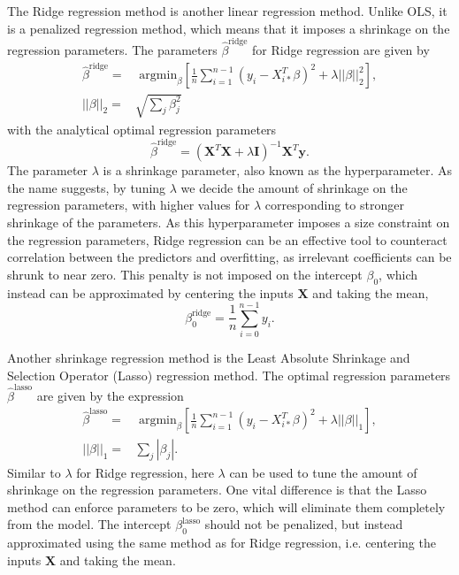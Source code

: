 \documentclass[a4paper, 10pt]{article}
\begin{document}
\begin{multicols}{2}
The Ridge regression method is another linear regression method. Unlike OLS, it is a penalized regression method, which means that it imposes a shrinkage on the regression parameters. The parameters $\hat{\beta}^\text{ridge}$ for Ridge regression are given by
\begin{align}
    \hat{\beta}^\text{ridge} = &\text{ argmin}_\beta \left[ \frac{1}{n}\sum_{i=1}^{n-1}(y_i-X_{i*}^T\beta)^2 + \lambda ||\beta||_2^2  \right],
    \label{eq:argminbeta_ridge}\\
        ||\beta||_2 =&  \sqrt{\sum_j \beta_j^2}
\end{align}
with the analytical optimal regression parameters
\begin{equation}
    \hat{\beta}^\text{ridge} = (\bm{X}^T\bm{X} +\lambda \bm{I})^{-1} \bm{X}^T \bm{y}.
    \label{eq:beta_ridge}
\end{equation}
The parameter $\lambda$ is a shrinkage parameter, also known as the hyperparameter. As the name suggests, by tuning $\lambda$ we decide the amount of shrinkage on the regression parameters, with higher values for $\lambda$ corresponding to stronger shrinkage of the parameters. As this hyperparameter imposes a size constraint on the regression parameters, Ridge regression can be an effective tool to counteract correlation between the predictors and overfitting, as irrelevant coefficients can be shrunk to near zero. This penalty is not imposed on the intercept $\beta_0$, which instead can be approximated by centering the inputs $\bm{X}$ and taking the mean,
\begin{equation}
	\beta_0^\text{ridge}=\frac{1}{n}\sum_{i=0}^{n-1}y_i.
	\label{eq:beta0_Ridge}
\end{equation}

Another shrinkage regression method is the  Least Absolute Shrinkage and Selection Operator (Lasso) regression method. The optimal regression parameters $\hat{\beta}^\text{lasso}$ are  given by the expression
\begin{align}
    \hat{\beta}^\text{lasso} =&  \text{ argmin}_\beta \left[  \frac{1}{n}\sum_{i=1}^{n-1}(y_i-X_{i*}^T\beta)^2 + \lambda ||\beta||_1  \right],
    \label{eq:argminbeta_lasso}\\
    ||\beta||_1 =& \sum_j |\beta_j|.
\end{align}
Similar to $\lambda$ for Ridge regression, here $\lambda$ can be used to tune the amount of shrinkage on the regression parameters. One vital difference is that the Lasso method can enforce parameters to be zero, which will eliminate them completely from the model.  The intercept $\beta_0^\text{lasso}$ should not be penalized, but instead approximated using the same method as for Ridge regression, i.e. centering the inputs $\bm{X}$ and taking the mean. 


\end{multicols}
\end{document}
